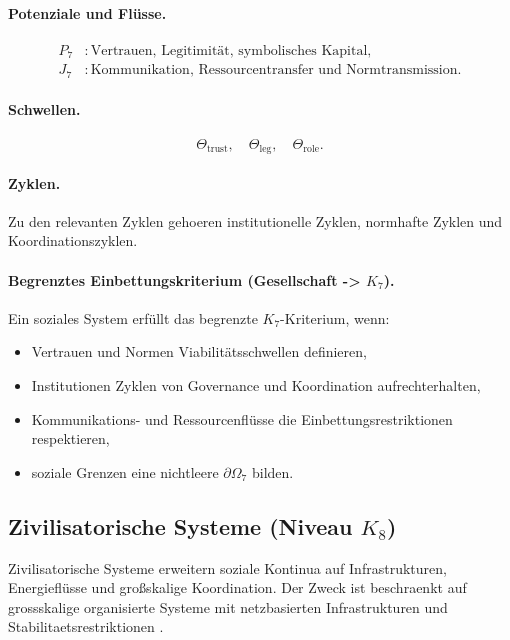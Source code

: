 \paragraph{Potenziale und Flüsse.}
\[
\begin{aligned}
  P_7 &: \text{Vertrauen, Legitimität, symbolisches Kapital},\\
  J_7 &: \text{Kommunikation, Ressourcentransfer und Normtransmission}.
\end{aligned}
\]

\paragraph{Schwellen.}
\[
  \Theta_{\mathrm{trust}},\quad
  \Theta_{\mathrm{leg}},\quad
  \Theta_{\mathrm{role}}.
\]

\paragraph{Zyklen.}
Zu den relevanten Zyklen gehoeren institutionelle Zyklen, normhafte Zyklen
und Koordinationszyklen.

\paragraph{Begrenztes Einbettungskriterium (Gesellschaft -> \texorpdfstring{\(K_7\)}{K7}).}
Ein soziales System erfüllt das begrenzte \(K_7\)-Kriterium, wenn:
\begin{itemize}
  \item Vertrauen und Normen Viabilitätsschwellen definieren,
  \item Institutionen Zyklen von Governance und Koordination aufrechterhalten,
  \item Kommunikations- und Ressourcenflüsse die Einbettungsrestriktionen
        respektieren,
  \item soziale Grenzen eine nichtleere \(\partial\Omega_7\) bilden.
\end{itemize}

\subsection{Zivilisatorische Systeme (Niveau \texorpdfstring{$K_8$}{K8})}

Zivilisatorische Systeme erweitern soziale Kontinua auf Infrastrukturen,
Energieflüsse und großskalige Koordination.
Der Zweck ist beschraenkt auf grossskalige organisierte Systeme mit
netzbasierten Infrastrukturen und Stabilitaetsrestriktionen
\parencite{newman_networks,may_stability_complexity}.

